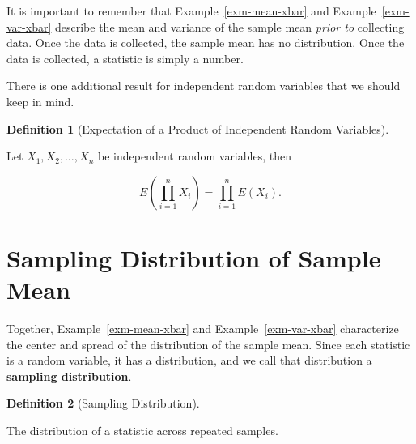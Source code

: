 \documentclass[
  letterpaper,
  DIV=11,
  numbers=noendperiod]{scrreprt}
\theoremstyle{definition}
\newtheorem{definition}{Definition}[chapter]
\theoremstyle{definition}
\theoremstyle{plain}
\theoremstyle{remark}
\begin{document}
\begin{tcolorbox}[enhanced jigsaw, title=\textcolor{quarto-callout-warning-color}{\faExclamationTriangle}\hspace{0.5em}{Warning}, colbacktitle=quarto-callout-warning-color!10!white, titlerule=0mm, toptitle=1mm, breakable, bottomtitle=1mm, colframe=quarto-callout-warning-color-frame, opacitybacktitle=0.6, bottomrule=.15mm, arc=.35mm, toprule=.15mm, colback=white, rightrule=.15mm, coltitle=black, leftrule=.75mm, left=2mm, opacityback=0]

It is important to remember that Example~\ref{exm-mean-xbar} and
Example~\ref{exm-var-xbar} describe the mean and variance of the sample
mean \emph{prior to} collecting data. Once the data is collected, the
sample mean has no distribution. Once the data is collected, a statistic
is simply a number.

\end{tcolorbox}

There is one additional result for independent random variables that we
should keep in mind.

\begin{definition}[Expectation of a Product of Independent Random
Variables]\protect\hypertarget{def-product-expectations}{}\label{def-product-expectations}

Let \(X_1, X_2, \dotsc, X_n\) be independent random variables, then

\[E\left(\prod_{i=1}^n X_i\right) = \prod_{i=1}^{n} E\left(X_i\right).\]

\end{definition}

\hypertarget{sampling-distribution-of-sample-mean}{%
\section{Sampling Distribution of Sample
Mean}\label{sampling-distribution-of-sample-mean}}

Together, Example~\ref{exm-mean-xbar} and Example~\ref{exm-var-xbar}
characterize the center and spread of the distribution of the sample
mean. Since each statistic is a random variable, it has a distribution,
and we call that distribution a \textbf{sampling distribution}.

\begin{definition}[Sampling
Distribution]\protect\hypertarget{def-sampling-distribution}{}\label{def-sampling-distribution}

The distribution of a statistic across repeated samples.

\end{definition}
\end{document}
